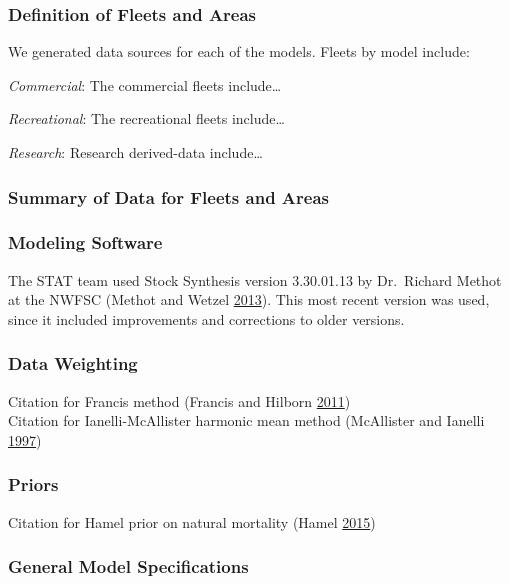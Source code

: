 \documentclass[12pt,]{article}
\begin{document}
\subsubsection{Definition of Fleets and
Areas}\label{definition-of-fleets-and-areas}

We generated data sources for each of the models. Fleets by model
include:

\emph{Commercial}: The commercial fleets include\ldots{}

\emph{Recreational}: The recreational fleets include\ldots{}

\emph{Research}: Research derived-data include\ldots{}

\subsubsection{Summary of Data for Fleets and
Areas}\label{summary-of-data-for-fleets-and-areas}

\subsubsection{Modeling Software}\label{modeling-software}

The STAT team used Stock Synthesis version 3.30.01.13 by Dr.~Richard
Methot at the NWFSC (Methot and Wetzel
\protect\hyperlink{ref-methot_stock_2013}{2013}). This most recent
version was used, since it included improvements and corrections to
older versions.

\subsubsection{Data Weighting}\label{data-weighting}

Citation for Francis method (Francis and Hilborn
\protect\hyperlink{ref-francis_data_2011}{2011})\\
Citation for Ianelli-McAllister harmonic mean method (McAllister and
Ianelli \protect\hyperlink{ref-mcallister_bayesian_1997}{1997})

\subsubsection{Priors}\label{priors}

Citation for Hamel prior on natural mortality (Hamel
\protect\hyperlink{ref-hamel_method_2015}{2015})

\subsubsection{General Model
Specifications}\label{general-model-specifications}
\end{document}
